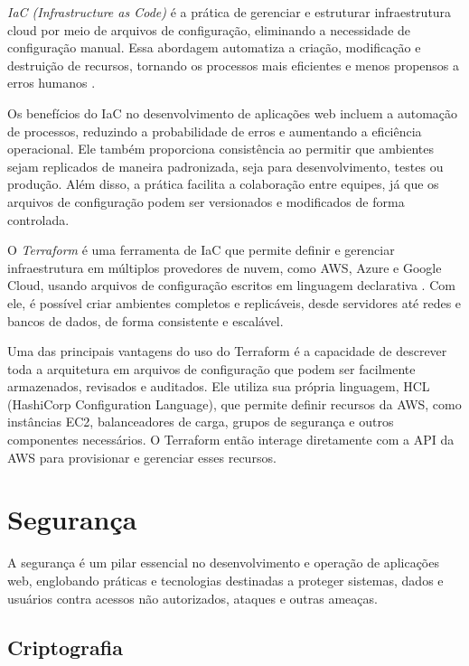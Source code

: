 
\emph{IaC (Infrastructure as Code)} é a prática de gerenciar e estruturar infraestrutura cloud por meio de arquivos de configuração, eliminando a necessidade de configuração manual. Essa abordagem automatiza a criação, modificação e destruição de recursos, tornando os processos mais eficientes e menos propensos a erros humanos \cite{what-is-iac}.

Os benefícios do IaC no desenvolvimento de aplicações web incluem a automação de processos, reduzindo a probabilidade de erros e aumentando a eficiência operacional. Ele também proporciona consistência ao permitir que ambientes sejam replicados de maneira padronizada, seja para desenvolvimento, testes ou produção. Além disso, a prática facilita a colaboração entre equipes, já que os arquivos de configuração podem ser versionados e modificados de forma controlada. 

O \emph{Terraform} é uma ferramenta de IaC que permite definir e gerenciar infraestrutura em múltiplos provedores de nuvem, como AWS, Azure e Google Cloud, usando arquivos de configuração escritos em linguagem declarativa \cite{terraform-docs}. Com ele, é possível criar ambientes completos e replicáveis, desde servidores até redes e bancos de dados, de forma consistente e escalável.

Uma das principais vantagens do uso do Terraform é a capacidade de descrever toda a arquitetura em arquivos de configuração que podem ser facilmente armazenados, revisados e auditados. Ele utiliza sua própria linguagem, HCL (HashiCorp Configuration Language), que permite definir recursos da AWS, como instâncias EC2, balanceadores de carga, grupos de segurança e outros componentes necessários. O Terraform então interage diretamente com a API da AWS para provisionar e gerenciar esses recursos.


\section{Segurança}

A segurança é um pilar essencial no desenvolvimento e operação de aplicações web, englobando práticas e tecnologias destinadas a proteger sistemas, dados e usuários contra acessos não autorizados, ataques e outras ameaças.


\subsection{Criptografia}

